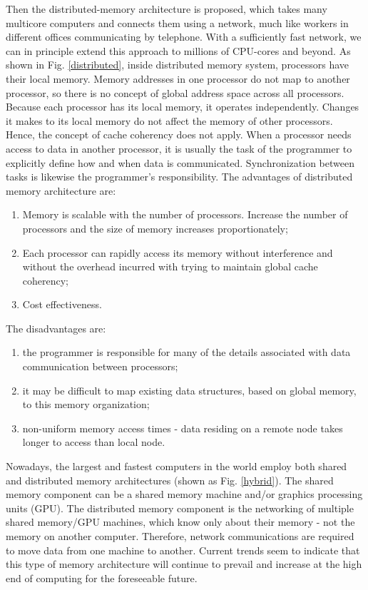 Then the distributed-memory architecture is proposed, which takes many multicore computers and connects them using a network, much like workers in different offices communicating by telephone. With a sufficiently fast network, we can in principle extend this approach to millions of CPU-cores and beyond. As shown in Fig. \ref{distributed}, inside distributed memory system, processors have their local memory. Memory addresses in one processor do not map to another processor, so there is no concept of global address space across all processors. Because each processor has its local memory, it operates independently. Changes it makes to its local memory do not affect the memory of other processors. Hence, the concept of cache coherency does not apply. When a processor needs access to data in another processor, it is usually the task of the programmer to explicitly define how and when data is communicated. Synchronization between tasks is likewise the programmer's responsibility. The advantages of distributed memory architecture are: 
\begin{enumerate}
	\item Memory is scalable with the number of processors. Increase the number of processors and the size of memory increases proportionately; 
	\item Each processor can rapidly access its memory without interference and without the overhead incurred with trying to maintain global cache coherency;
	\item Cost effectiveness.
\end{enumerate}

The disadvantages are: 
\begin{enumerate}
	\item the programmer is responsible for many of the details associated with data communication between processors;
	\item it may be difficult to map existing data structures, based on global memory, to this memory organization;
	\item non-uniform memory access times - data residing on a remote node takes longer to access than local node.
\end{enumerate}

Nowadays, the largest and fastest computers in the world employ both shared and distributed memory architectures (shown as Fig. \ref{hybrid}). The shared memory component can be a shared memory machine and/or graphics processing units (GPU). The distributed memory component is the networking of multiple shared memory/GPU machines, which know only about their memory - not the memory on another computer. Therefore, network communications are required to move data from one machine to another. Current trends seem to indicate that this type of memory architecture will continue to prevail and increase at the high end of computing for the foreseeable future.

